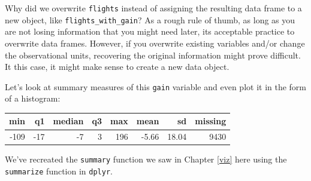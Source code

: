 \documentclass[]{tufte-book}
\newenvironment{Shaded}{\begin{snugshade}}{\end{snugshade}}
\newcommand{\KeywordTok}[1]{\textcolor[rgb]{0.13,0.29,0.53}{\textbf{{#1}}}}
\newcommand{\DataTypeTok}[1]{\textcolor[rgb]{0.13,0.29,0.53}{{#1}}}
\newcommand{\FloatTok}[1]{\textcolor[rgb]{0.00,0.00,0.81}{{#1}}}
\newcommand{\StringTok}[1]{\textcolor[rgb]{0.31,0.60,0.02}{{#1}}}
\newcommand{\OtherTok}[1]{\textcolor[rgb]{0.56,0.35,0.01}{{#1}}}
\newcommand{\NormalTok}[1]{{#1}}
\begin{document}
Why did we overwrite \texttt{flights} instead of assigning the resulting
data frame to a new object, like \texttt{flights\_with\_gain}? As a
rough rule of thumb, as long as you are not losing information that you
might need later, its acceptable practice to overwrite data frames.
However, if you overwrite existing variables and/or change the
observational units, recovering the original information might prove
difficult. It this case, it might make sense to create a new data
object.

Let's look at summary measures of this \texttt{gain} variable and even
plot it in the form of a histogram:

\begin{Shaded}
\end{Shaded}

\begin{tabular}{r|r|r|r|r|r|r|r}
\hline
min & q1 & median & q3 & max & mean & sd & missing\\
\hline
-109 & -17 & -7 & 3 & 196 & -5.66 & 18.04 & 9430\\
\hline
\end{tabular}

We've recreated the \texttt{summary} function we saw in Chapter
\ref{viz} here using the \texttt{summarize} function in \texttt{dplyr}.
\end{document}
